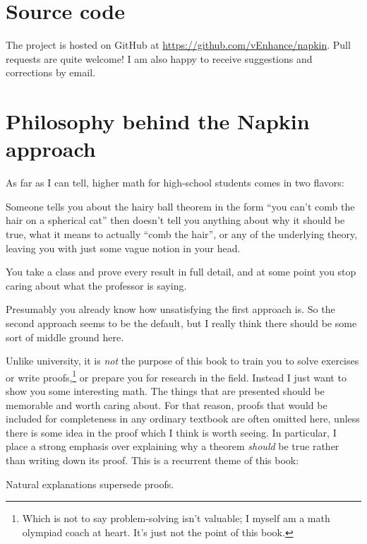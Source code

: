 \section*{Source code}
The project is hosted on GitHub at
\url{https://github.com/vEnhance/napkin}.
Pull requests are quite welcome!
I am also happy to receive suggestions and corrections by email.

\section*{Philosophy behind the Napkin approach}
As far as I can tell, higher math for high-school students
comes in two flavors:
\begin{itemize}
	\ii Someone tells you about the hairy ball theorem in the form
	``you can't comb the hair on a spherical cat''
	then doesn't tell you anything about why it should be true,
	what it means to actually ``comb the hair'',
	or any of the underlying theory,
	leaving you with just some vague notion in your head.

	\ii You take a class and prove every result in full detail,
	and at some point you stop caring about what the professor is saying.
\end{itemize}
Presumably you already know how unsatisfying the first approach is.
So the second approach seems to be the default,
but I really think there should be some sort of middle ground here.


Unlike university, it is \emph{not} the purpose of this book to
train you to solve exercises or write proofs,\footnote{Which is
	not to say problem-solving isn't valuable;
	I myself am a math olympiad coach at heart.
	It's just not the point of this book.}
or prepare you for research in the field.
Instead I just want to show you some interesting math.
The things that are presented should be memorable and worth caring about.
For that reason, proofs that would be included for completeness
in any ordinary textbook are often omitted here,
unless there is some idea in the proof which I think is worth seeing.
In particular, I place a strong emphasis over explaining
why a theorem \emph{should} be true rather than writing down its proof.
This is a recurrent theme of this book:
\begin{moral}
	Natural explanations supersede proofs.
\end{moral}

